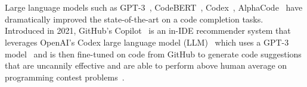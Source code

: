 \section{\cct{}}
Large language models such as GPT-3~\cite{Gpt3}, CodeBERT~\cite{codebert}, Codex~\cite{copilot}, AlphaCode~\cite{alphacode} have dramatically improved the state-of-the-art on a code completion tasks. 
Introduced in 2021, GitHub's Copilot~\cite{Copilot-web} is an in-IDE recommender system that leverages OpenAI's Codex large language model (LLM)~\cite{copilot} which uses a GPT-3 model~\cite{Gpt3} and is then fine-tuned on code from GitHub to generate code suggestions that are uncannily effective and are able to perform above human average on programming contest problems~\cite{empirical_eval}.